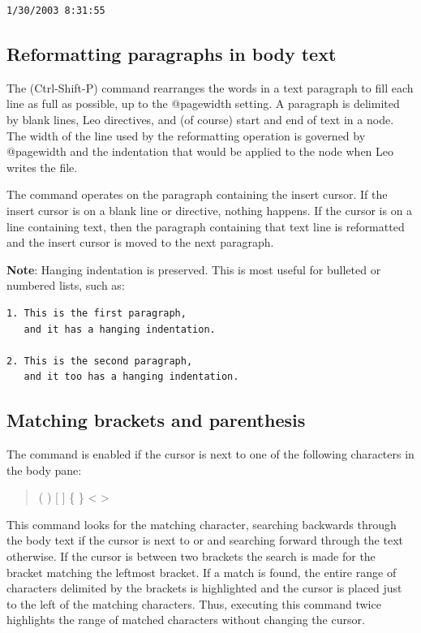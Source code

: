 \documentclass[a4paper,10pt,english]{sphinxmanual}
\begin{document}
\begin{Verbatim}[commandchars=\\\{\}]
1/30/2003 8:31:55
\end{Verbatim}


\subsection{Reformatting paragraphs in body text}
\label{commands:reformatting-paragraphs-in-body-text}
The  (Ctrl-Shift-P) command rearranges the words in a
text paragraph to fill each line as full as possible, up to the @pagewidth
setting. A paragraph is delimited by blank lines, Leo directives, and (of
course) start and end of text in a node. The width of the line used by the
reformatting operation is governed by @pagewidth and the indentation that
would be applied to the node when Leo writes the file.

The command operates on the paragraph containing the insert cursor. If the
insert cursor is on a blank line or directive, nothing happens. If the
cursor is on a line containing text, then the paragraph containing that
text line is reformatted and the insert cursor is moved to the next
paragraph.

\textbf{Note}: Hanging indentation is preserved. This is most useful for
bulleted or numbered lists, such as:

\begin{Verbatim}[commandchars=\\\{\}]
1. This is the first paragraph,
   and it has a hanging indentation.

2. This is the second paragraph,
   and it too has a hanging indentation.
\end{Verbatim}


\subsection{Matching brackets and parenthesis}
\label{commands:matching-brackets-and-parenthesis}
The  command is enabled if the cursor is next to one of the
following characters in the body pane:
\begin{quote}

( ) {[} {]} \{ \} \textless{} \textgreater{}
\end{quote}

This command looks for the matching character, searching backwards through
the body text if the cursor is next to \code{)} \code{{]}} \code{\}} or \code{\textgreater{}} and
searching forward through the text otherwise. If the cursor is between two
brackets the search is made for the bracket matching the leftmost bracket.
If a match is found, the entire range of characters delimited by the
brackets is highlighted and the cursor is placed just to the left of the
matching characters. Thus, executing this command twice highlights the
range of matched characters without changing the cursor.
\end{document}
